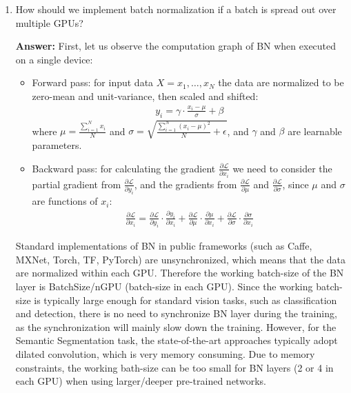 \documentclass{article}
\newenvironment{QandA}{\begin{enumerate}[label=\arabic*.]}{\end{enumerate}}
\newenvironment{answer}{\par\normalfont \textbf{Answer:}}{}
\begin{document}
\begin{QandA}
    \item How should we implement batch normalization if a batch is spread out over multiple GPUs?
    \begin{answer}
        First, let us observe the computation graph of BN when executed on a single device:
        \begin{itemize}
            \item Forward pass: for input data $X = x_1, \ldots, x_N$ the data are normalized to be zero-mean and unit-variance, then scaled and shifted:
            \begin{align*}
                y_i = \gamma \cdot \frac{x_i - \mu}{\sigma} + \beta
            \end{align*}
            where $\mu = \frac{\sum_{i=1}^N x_i}{N}$ and $\sigma = \sqrt{\frac{\sum_{i=1}^N (x_i - \mu)^2}{N} + \epsilon}$, and $\gamma$ and $\beta$ are learnable parameters. 
            \item Backward pass: for calculating the gradient $\frac{\partial \mathcal{L}}{\partial x_i}$ we need to consider the partial gradient from $\frac{\partial \mathcal{L}}{\partial y_i}$, and the gradients from $\frac{\partial \mathcal{L}}{\partial \mu}$ and $\frac{\partial \mathcal{L}}{\partial \sigma}$, since $\mu$ and $\sigma$ are functions of $x_i$:
            \begin{align*}
                \frac{\partial \mathcal{L}}{\partial x_i} = \frac{\partial \mathcal{L}}{\partial y_i} \cdot \frac{\partial y_i}{\partial x_i} + \frac{\partial \mathcal{L}}{\partial \mu} \cdot \frac{\partial \mu}{\partial x_i} + \frac{\partial \mathcal{L}}{\partial \sigma} \cdot \frac{\partial \sigma}{\partial x_i}
            \end{align*}
        \end{itemize}
        Standard implementations of BN in public frameworks (such as Caffe, MXNet, Torch, TF, PyTorch) are unsynchronized, which means that the data are normalized within each GPU. Therefore the working batch-size of the BN layer is BatchSize/nGPU (batch-size in each GPU). Since the working batch-size is typically large enough for standard vision tasks, such as classification and detection, there is no need to synchronize BN layer during the training, as the synchronization will mainly slow down the training. However, for the Semantic Segmentation task, the state-of-the-art approaches typically adopt dilated convolution, which is very memory consuming. Due to memory constraints, the working bath-size can be too small for BN layers (2 or 4 in each GPU) when using larger/deeper pre-trained networks.\\\\

\end{answer}
\end{QandA}
\end{document}
